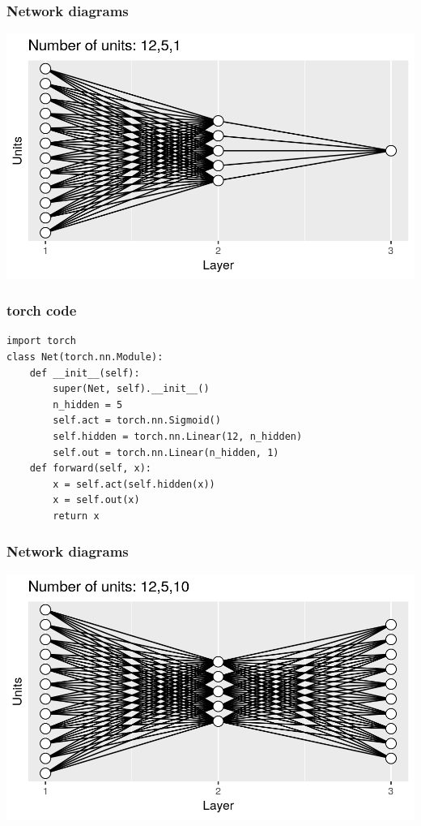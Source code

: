 \documentclass{beamer}
\begin{document}
\begin{frame}
  \frametitle{Network diagrams}

\includegraphics[width=\textwidth]{figure-architecture-oneOut}
\end{frame}

\begin{frame}[fragile]
  \frametitle{torch code}
\begin{verbatim}
import torch
class Net(torch.nn.Module):
    def __init__(self):
        super(Net, self).__init__()
        n_hidden = 5
        self.act = torch.nn.Sigmoid()
        self.hidden = torch.nn.Linear(12, n_hidden)
        self.out = torch.nn.Linear(n_hidden, 1)
    def forward(self, x):
        x = self.act(self.hidden(x))
        x = self.out(x)
        return x
\end{verbatim}
\end{frame}

\begin{frame}
  \frametitle{Network diagrams}

\includegraphics[width=\textwidth]{figure-architecture-tenOut}
\end{frame}
\end{document}
